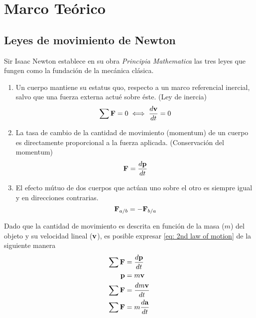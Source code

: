 \section{Marco Teórico}

\subsection{Leyes de movimiento de Newton}

Sir Isaac Newton establece en su obra \emph{Principia Mathematica} las tres leyes que fungen como la fundación de la mecánica clásica.

\begin{enumerate}
 \item Un cuerpo mantiene su estatus quo, 
 respecto a un marco referencial inercial, salvo
 que una fuerza externa actué sobre éste. (Ley de inercia)
 \begin{equation}
  \sum \bold{F} = 0 \iff \dfrac{d \bold{v}}{dt} = 0
 \end{equation}

 \item La tasa de cambio de la cantidad de movimiento (momentum) de un cuerpo
 es directamente proporcional a la fuerza aplicada. (Conservación del momentum)
 \begin{equation}
  \bold{F} = \dfrac{d \bold{p}}{dt}
  \label{eq: 2nd law of motion}
 \end{equation}

 \item El efecto mútuo de dos cuerpos que actúan 
 uno sobre el otro es siempre igual y en direcciones contrarias.
 \begin{equation}
  \bold{F}_{a/b} = -\bold{F}_{b/a}
 \end{equation}

\end{enumerate}

Dado que la cantidad de movimiento es descrita en función de la masa ($m$)
del objeto y su velocidad lineal ($\bold{v}$), 
es posible expresar \eqref{eq: 2nd law of motion} de la siguiente manera
\begin{equation}
 \begin{split}
  \sum \bold{F} & = \dfrac{d \bold{p}}{dt}\\
  \bold{p} & = m \bold{v}\\
  \sum \bold{F} & = \dfrac{d m\bold{v}}{dt}\\
  \sum \bold{F} & = m\dfrac{d\bold{a}}{dt}
 \end{split}
 \label{eq: conservation of linear momentum}
\end{equation}

